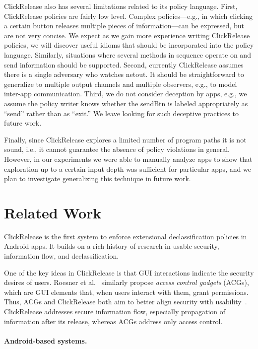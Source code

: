 \documentclass{llncs}
\newcommand{\code}[1]{\textsf{#1}} %
\newcommand{\toolname}{ClickRelease\xspace}
\begin{document}
\toolname{} also has several limitations related to its policy
language. First, \toolname{} policies are fairly low level. Complex
policies---e.g., in which clicking a certain button releases
multiple pieces of information---can be expressed, but are not very
concise. We expect as we gain more experience writing \toolname{}
policies, we will discover useful idioms that should be incorporated
into the policy language.  Similarly, situations where several
methods in sequence operate on and send information should be
supported.  Second, currently \toolname{} assumes there
is a single adversary who watches \code{netout}. It should be
straightforward to generalize to multiple output channels and multiple
observers, e.g., to model inter-app communication.  Third, we do not
consider deception by apps, e.g., we assume the policy writer knows
whether the \code{sendBtn} is labeled appropriately as ``send'' rather
than as ``exit.'' We leave looking for such deceptive practices to
future work.

Finally, since \toolname{} explores a limited number of program paths
it is not sound, i.e., it cannot guarantee the absence of policy
violations in general. However, in our experiments we were able to
manually analyze apps to show that exploration up to a certain input
depth was sufficient for particular apps, and we plan to investigate
generalizing this technique in future work.

\section{Related Work}
\label{sec:related-work}

\toolname is the first system to enforce extensional declassification policies 
in Android apps.  It builds on a rich history of research in usable security,
information flow, and declassification.

One of the key ideas in \toolname is that GUI interactions indicate the 
security desires of users.
Roesner et al.~\cite{Roesner:12} similarly propose \emph{access control gadgets}
(ACGs), which are GUI elements that, when users interact with them,
grant permissions. 
Thus, ACGs and \toolname both aim to better align 
security with usability~\cite{Yee:04}.
\toolname addresses secure information flow, especially propagation of
information after its release, whereas ACGs address only access control.

\paragraph*{Android-based systems.}
\end{document}
